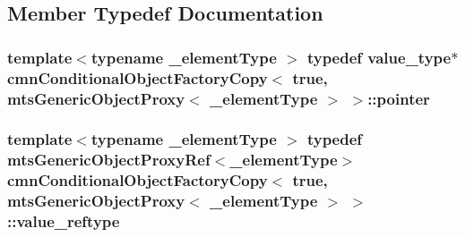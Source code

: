 \subsection{Member Typedef Documentation}
\hypertarget{classcmn_conditional_object_factory_copy_3_01true_00_01mts_generic_object_proxy_3_01__element_type_01_4_01_4_a00518536863dfeebbba5ece74e4b2303}{
\subsubsection[{pointer}]{\setlength{\rightskip}{0pt plus 5cm}template$<$typename \-\_\-element\-Type $>$ typedef {\bf value\-\_\-type}$\ast$ {\bf cmn\-Conditional\-Object\-Factory\-Copy}$<$ true, {\bf mts\-Generic\-Object\-Proxy}$<$ \-\_\-element\-Type $>$ $>$\-::{\bf pointer}}}\label{classcmn_conditional_object_factory_copy_3_01true_00_01mts_generic_object_proxy_3_01__element_type_01_4_01_4_a00518536863dfeebbba5ece74e4b2303}
\hypertarget{classcmn_conditional_object_factory_copy_3_01true_00_01mts_generic_object_proxy_3_01__element_type_01_4_01_4_ae3b76e4662e4828ea5f57f42bb46a35b}{
\subsubsection[{value\-\_\-reftype}]{\setlength{\rightskip}{0pt plus 5cm}template$<$typename \-\_\-element\-Type $>$ typedef {\bf mts\-Generic\-Object\-Proxy\-Ref}$<$\-\_\-element\-Type$>$ {\bf cmn\-Conditional\-Object\-Factory\-Copy}$<$ true, {\bf mts\-Generic\-Object\-Proxy}$<$ \-\_\-element\-Type $>$ $>$\-::{\bf value\-\_\-reftype}}}\label{classcmn_conditional_object_factory_copy_3_01true_00_01mts_generic_object_proxy_3_01__element_type_01_4_01_4_ae3b76e4662e4828ea5f57f42bb46a35b}
